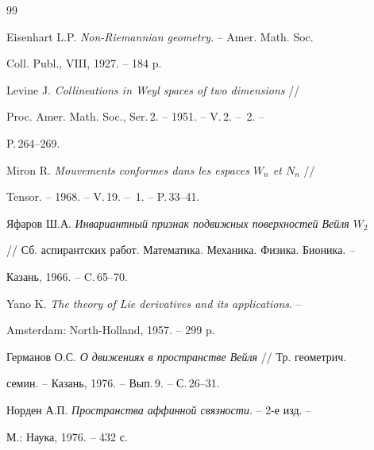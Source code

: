 \begin{thebibliography}{99} 


 




Eisenhart L.P. {\em Non-Riemannian geometry}. -- Amer. Math. Soc. 


Coll. Publ., VIII, 1927. -- 184 p. 


 




Levine J. {\em Collineations in Weyl spaces of two dimensions} // 


Proc. Amer. Math. Soc., Ser.\,2. -- 1951. -- V.\,2. -- \No\,2. -- 


P.\,264--269. 


 




Miron R. {\em Mouvements conformes dans les espaces $W_n$ et $N_n$} // 


Tensor. -- 1968. -- V.\,19. -- \No\,1. -- P.\,33--41. 


 




Яфаров Ш.А. {\em Инвариантный признак подвижных поверхностей Вейля $W_2$} 


// Сб. аспирантских работ. Математика. Механика. Физика. Бионика. -- 


Казань, 1966. -- C.\,65--70. 


 




Yano K. {\em The theory of Lie derivatives and its applications}. -- 


Amsterdam: North-Holland, 1957. -- 299 p. 


 




Германов О.С. {\em О движениях в пространстве Вейля} // Тр. геометрич. 


семин. -- Казань, 1976. -- Вып.\,9. -- С.\,26--31. 


 




Норден А.П. {\em Пространства аффинной связности}. -- 2-е изд. --


М.: Наука, 1976. -- 432 с. 



\end{thebibliography}
